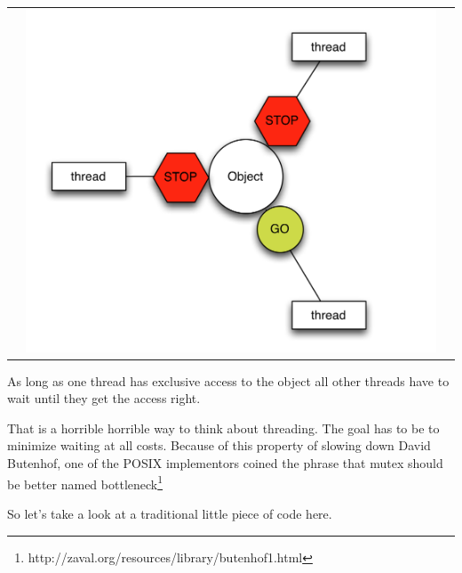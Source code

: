 \begin{table}[h!]
\begin{tabular}{ c  c  c }
\begin{minipage}{.3\textwidth}
		\end{minipage} 
		&
	  \begin{minipage}{.3\textwidth}
		  \includegraphics[width=\linewidth]{images/TraditionalLock03.png} 
		\end{minipage} 
	\end{tabular}
\end{table}

As long as one thread has exclusive access to the object all other threads have to wait until they get the access right. 

That is a horrible horrible way to think about threading. The goal has to be to minimize waiting at all costs. Because of this property of slowing down David Butenhof, one of the POSIX implementors coined the phrase that mutex should be better named bottleneck\footnote{http://zaval.org/resources/library/butenhof1.html}


So let's take a look at a traditional little piece of code here. 

\begin{minipage}{\linewidth}
	
\end{minipage}

